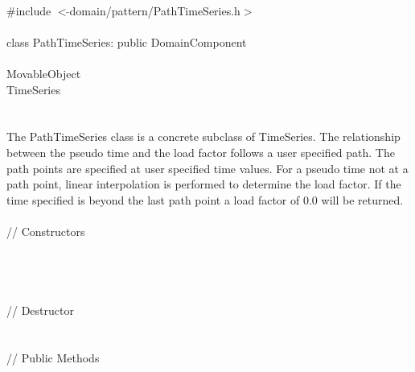 
   \\
\indent \#include $<\tilde{ }$domain/pattern/PathTimeSeries.h$>$  \\

  \\
\indent class PathTimeSeries: public DomainComponent  \\

 \\
\indent MovableObject \\
\indent\indent TimeSeries \\
\indent\indent{} \\

 \\ 
\indent The PathTimeSeries class is a concrete subclass of TimeSeries.
The relationship between the pseudo time and the load factor follows
a user specified path. The path points are specified at user specified
time values. For a pseudo time not at a path point, linear interpolation
is performed to determine the load factor. If the time specified is
beyond the last path point a load factor of $0.0$ will be returned.\\

 \\
\indent // Constructors \\ 
\\ 
\\ 
\\ \\
\indent // Destructor \\ 
\\  \\
\indent // Public Methods \\ 
\\
\\
\\
\\

